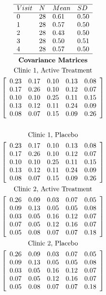 \documentclass{article}
\begin{document}
\begin{flushleft}
\begin{multline*}
\begin{array}{llll}
\hline
Visit & N & Mean & SD\\
\hline
0 & 28 & 0.61 & 0.50 \\ 
1 & 28 & 0.57 & 0.50 \\ 
2 & 28 & 0.43 & 0.50 \\ 
3 & 28 & 0.50 & 0.51 \\ 
4 & 28 & 0.57 & 0.50 \\ 
\hline
\end{array}\\
\textbf{Covariance Matrices}\\
\text{Clinic 1, Active Treatment}\\
\left[\begin{array}{rrrrr}
0.23 & 0.17 & 0.10 & 0.13 & 0.08 \\ 
0.17 & 0.26 & 0.10 & 0.12 & 0.07 \\ 
0.10 & 0.10 & 0.25 & 0.11 & 0.15 \\ 
0.13 & 0.12 & 0.11 & 0.24 & 0.09 \\ 
0.08 & 0.07 & 0.15 & 0.09 & 0.26 \\  
\end{array}\right]\\\\
\text{Clinic 1, Placebo}\\
\left[\begin{array}{rrrrr}
0.23 & 0.17 & 0.10 & 0.13 & 0.08 \\ 
0.17 & 0.26 & 0.10 & 0.12 & 0.07 \\ 
0.10 & 0.10 & 0.25 & 0.11 & 0.15 \\ 
0.13 & 0.12 & 0.11 & 0.24 & 0.09 \\ 
0.08 & 0.07 & 0.15 & 0.09 & 0.26 \\ 
\end{array}\right]\\
\text{Clinic 2, Active Treatment}\\
\left[\begin{array}{rrrrr}
0.26 & 0.09 & 0.03 & 0.07 & 0.05 \\ 
0.09 & 0.13 & 0.05 & 0.05 & 0.08 \\ 
0.03 & 0.05 & 0.16 & 0.12 & 0.07 \\ 
0.07 & 0.05 & 0.12 & 0.16 & 0.07 \\ 
0.05 & 0.08 & 0.07 & 0.07 & 0.18 \\  
\end{array}\right]\\
\text{Clinic 2, Placebo}\\
\left[\begin{array}{rrrrr}
0.26 & 0.09 & 0.03 & 0.07 & 0.05 \\ 
0.09 & 0.13 & 0.05 & 0.05 & 0.08 \\ 
0.03 & 0.05 & 0.16 & 0.12 & 0.07 \\ 
0.07 & 0.05 & 0.12 & 0.16 & 0.07 \\ 
0.05 & 0.08 & 0.07 & 0.07 & 0.18 \\ 
\end{array}\right]\\
\end{multline*}

\end{flushleft}
\end{document}
